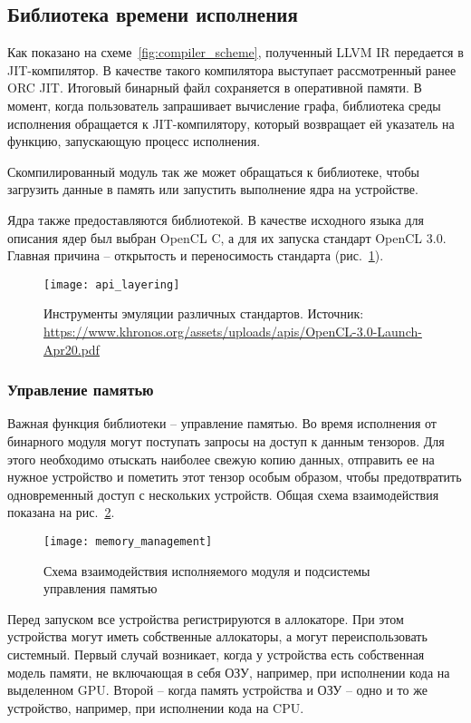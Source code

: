 \subsection{Библиотека времени исполнения}
Как показано на схеме~\ref{fig:compiler_scheme}, полученный LLVM IR передается
в JIT-компилятор. В качестве такого компилятора выступает рассмотренный ранее
ORC JIT. Итоговый бинарный файл сохраняется в оперативной памяти. В момент,
когда пользователь запрашивает вычисление графа, библиотека среды исполнения
обращается к JIT-компилятору, который возвращает ей указатель на функцию,
запускающую процесс исполнения.

Скомпилированный модуль так же может обращаться к библиотеке, чтобы загрузить
данные в память или запустить выполнение ядра на устройстве.

Ядра также предоставляются библиотекой. В качестве исходного языка для описания
ядер был выбран OpenCL C, а для их запуска стандарт OpenCL 3.0. Главная причина
-- открытость и переносимость стандарта (рис.~\ref{fig:api_layering}).

\begin{figure}[h]
  \centering
  \texttt{[image: api\_layering]}
  \caption{Инструменты эмуляции различных стандартов. Источник: \url{https://www.khronos.org/assets/uploads/apis/OpenCL-3.0-Launch-Apr20.pdf}}
  \label{fig:api_layering}
\end{figure}

\subsubsection{Управление памятью}

Важная функция библиотеки -- управление памятью. Во время исполнения от бинарного
модуля могут поступать запросы на доступ к данным тензоров. Для этого необходимо
отыскать наиболее свежую копию данных, отправить ее на нужное устройство и
пометить этот тензор особым образом, чтобы предотвратить одновременный доступ
с нескольких устройств. Общая схема взаимодействия показана на 
рис.~\ref{fig:memory_management}.

\begin{figure}[h]
  \centering
  \texttt{[image: memory\_management]}
  \caption{Схема взаимодействия исполняемого модуля и подсистемы управления памятью}
  \label{fig:memory_management}
\end{figure}

Перед запуском все устройства регистрируются в аллокаторе. При этом устройства
могут иметь собственные аллокаторы, а могут переиспользовать системный. Первый
случай возникает, когда у устройства есть собственная модель памяти, не
включающая в себя ОЗУ, например, при исполнении кода на выделенном GPU. Второй --
когда память устройства и ОЗУ -- одно и то же устройство, например, при
исполнении кода на CPU.

